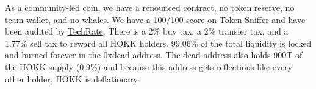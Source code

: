 \documentclass{article}
\begin{document}
As a community-led coin, we have a \href{https://etherscan.io/tx/0x06ca2f1e4203da09f8ac48351c726af638fa018b9078f24878fc5838ce9c01c4}{renounced contract}, no token reserve, no team wallet, and no whales. We have a 100/100 score on \href{https://tokensniffer.com/token/eth/b4sx59z86ppaszdabzp9xp1bafkdj9ljqhf2bi2mgvjc0q0o2n4a4es0kbsa}{Token Sniffer} and have been audited by \href{https://github.com/TechRate/Smart-Contract-Audits/blob/main/2018-21%20A-M/Hokkaidu%20Inu.pdf}{TechRate}. There is a 2\% buy tax, a 2\% transfer tax, and a 1.77\% sell tax to reward all HOKK holders. 99.06\% of the total liquidity is locked and burned forever in the \href{https://etherscan.io/address/0x000000000000000000000000000000000000dead}{0xdead} address. The dead address also holds 900T of the HOKK supply (0.9\%) and because this address gets reflections like every other holder, HOKK is deflationary.

\newpage
\end{document}
